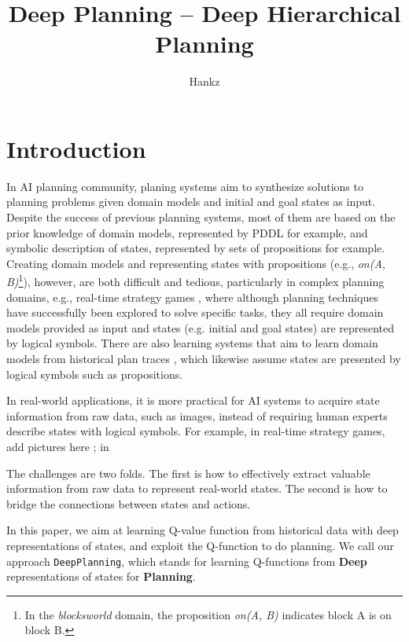 \documentclass[letterpaper]{article}
\newcommand{\hankz}[1]{{\color{blue} #1 \color{black}}}
\begin{document}
%
\title{Deep Planning -- Deep Hierarchical Planning}
\author{ Hankz
}
\maketitle

\begin{abstract}

\end{abstract}

\section{Introduction}
In AI planning community, planing systems aim to synthesize solutions to planning problems given domain models and initial and goal states as input. Despite the success of previous planning systems, most of them are based on the prior knowledge of domain models, represented by PDDL \cite{DBLP:journals/jair/FoxL03} for example, and symbolic description of states, represented by sets of propositions for example. Creating domain models and representing states with propositions (e.g., \emph{on(A, B)}\footnote{In the \emph{blocksworld} domain, the proposition \emph{on(A, B)} indicates block A is on block B.}), however, are both difficult and tedious, particularly in complex planning domains, e.g., real-time strategy games \cite{DBLP:conf/dagstuhl/CowlingBBBBBHMNS13,DBLP:conf/ijcai/Buro03,DBLP:conf/ijcai/OntanonB15}, where although planning techniques have successfully been explored to solve specific tasks, they all require domain models provided as input and states (e.g. initial and goal states) are represented by logical symbols. There are also learning systems that aim to learn domain models from historical plan traces \cite{}, which likewise assume states are presented by logical symbols such as propositions. 

In real-world applications, it is more practical for AI systems to acquire state information from raw data, such as images, instead of requiring human experts describe states with logical symbols. For example, in real-time strategy games, \hankz{add pictures here}; in 

The challenges are two folds. The first is how to effectively extract valuable information from raw data to represent real-world states. The second is how to bridge the connections between states and actions. 

In this paper, we aim at learning Q-value function from historical data with deep representations of states, and exploit the Q-function to do planning. We call our approach {\tt DeepPlanning}, which stands for learning Q-functions from \textbf{Deep} representations of states for \textbf{Planning}.
\end{document}
